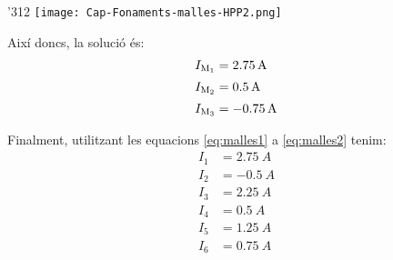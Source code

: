 \begin{exemple}
\begin{dingautolist}{'312}
         \texttt{[image: Cap-Fonaments-malles-HPP2.png]}
    \end{dingautolist}

    Així doncs, la solució és:
    \begin{align*}
        I_\mathrm{M_1} &= \qty{2,75}{A} \\[0.5ex]
        I_\mathrm{M_2} &= \qty{0,5}{A} \\[0.5ex]
        I_\mathrm{M_3} &= \qty{-0,75}{A}
    \end{align*}

    Finalment, utilitzant les equacions \eqref{eq:malles1} a \eqref{eq:malles2} tenim:
    \begin{align*}
        I_1 &= \qty{2,75}{A} \\[0.5ex]
        I_2 &= \qty{-0,5}{A} \\[0.5ex]
        I_3 &= \qty{2,25}{A} \\[0.5ex]
        I_4 &= \qty{0,5}{A} \\[0.5ex]
        I_5 &=  \qty{1,25}{A} \\[0.5ex]
        I_6 &= \qty{0,75}{A}
    \end{align*}

\end{exemple}

